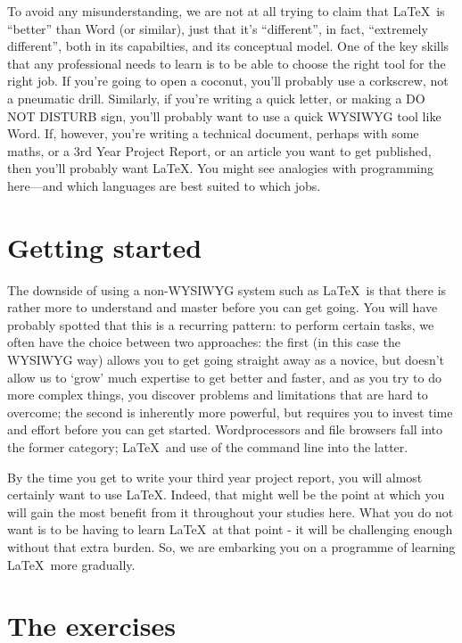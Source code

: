 \begin{refsection}
To avoid any  misunderstanding, we are not at all trying to claim that \LaTeX\ is ``better'' than Word (or similar), just that it's ``different'', in fact, ``extremely different'', both in its capabilties, and its conceptual model. One of the key skills that any professional needs to learn is to be able to choose the right tool for the right job. If you're going to open a coconut, you'll probably use a corkscrew, not a pneumatic drill. Similarly, if you're writing a quick letter, or making a DO NOT DISTURB sign, you'll probably want to use a quick WYSIWYG tool like Word. If, however, you're writing a technical document, perhaps with some maths, or a 3rd Year Project Report, or an article you want to get published, then you'll probably want \LaTeX.  You might see analogies with programming here---and which languages are best suited to which jobs.

\section{Getting started}

The downside of using a non-WYSIWYG system such as \LaTeX\ is that there is rather more to understand and master before you can get going. You will have probably spotted that this is a recurring pattern: to perform certain tasks, we often have the choice between two approaches: the first (in this case the WYSIWYG way) allows you to get going straight away as a novice, but doesn't allow us to `grow' much expertise to get better and faster, and as you try to do more complex things, you discover problems and limitations that are hard to overcome; the second is inherently more powerful, but requires you to invest time and effort before you can get started. Wordprocessors and file browsers fall into the former category; \LaTeX\ and use of the command line into the latter.

By the time you get to write your third year project report, you will almost certainly want to use \LaTeX. Indeed, that might well be the point at which you will gain the most benefit from it throughout your studies here. What you do not want is to be having to learn \LaTeX\ at that point - it will be challenging enough without that extra burden. So, we are embarking you on a programme of learning \LaTeX\ more gradually.


\section{The exercises}


\end{refsection}
